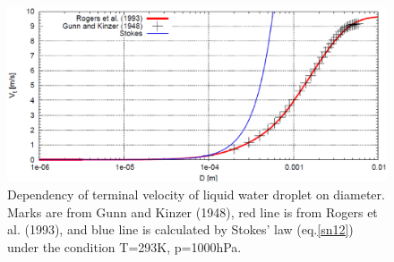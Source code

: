 \begin{table}[h]
\begin{center}
\caption{Branch points of the weighted terminal velocity.}
\label{table_sn14-2-10}
\end{center}
\end{table}

\begin{figure}[htbp]
\begin{center}
\includegraphics[scale=0.3]{./figure/D_vt_sn14.eps}
\end{center}
\caption{Dependency of terminal velocity of liquid water droplet on diameter. Marks are from Gunn and Kinzer (1948), red line is from Rogers et al. (1993), and blue line is calculated by Stokes’ law (eq.\ref{sn12}) under the condition T=293K, p=1000hPa.}
\label{figsn2-11}
\end{figure}

